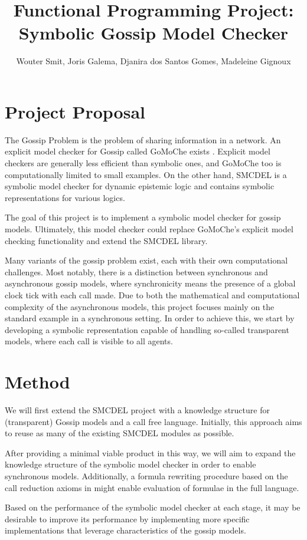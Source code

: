 \documentclass[12pt,a4paper]{article}
\title{Functional Programming Project:\\ Symbolic Gossip Model Checker}
\author{Wouter Smit, Joris Galema, Djanira dos Santos Gomes, Madeleine Gignoux}
\date{ }
\begin{document}
\maketitle

\section*{Project Proposal} 
The Gossip Problem is the problem of sharing information in a network. An explicit model checker for Gossip called GoMoChe exists \cite{gattinger2023gomoche}. Explicit model checkers are generally less efficient than symbolic ones, and GoMoChe too is computationally limited to small examples. On the other hand, SMCDEL is a symbolic model checker for dynamic epistemic logic and contains symbolic representations for various logics.

The goal of this project is to implement a symbolic model checker for gossip models. Ultimately, this model checker could replace GoMoChe's explicit model checking functionality and extend the SMCDEL library.

Many variants of the gossip problem exist, each with their own computational challenges. Most notably, there is a distinction between synchronous and asynchronous gossip models, where synchronicity means the presence of a global clock tick with each call made. Due to both the mathematical and computational complexity of the asynchronous models, this project focuses mainly on the standard example in a synchronous setting. In order to achieve this, we start by developing a symbolic representation capable of handling so-called transparent models, where each call is visible to all agents.

\section{Method}
We will first extend the SMCDEL project with a knowledge structure for (transparent) Gossip models and a call free language. Initially, this approach aims to reuse as many of the existing SMCDEL modules as possible.

After providing a minimal viable product in this way, we will aim to expand the knowledge structure of the symbolic model checker in order to enable synchronous models. Additionally, a formula rewriting procedure based on the call reduction axioms in \cite{van_ditmarsch_logic_2020} might enable evaluation of formulae in the full language.

Based on the performance of the symbolic model checker at each stage, it may be desirable to improve its performance by implementing more specific implementations that leverage characteristics of the gossip models.
\end{document}
